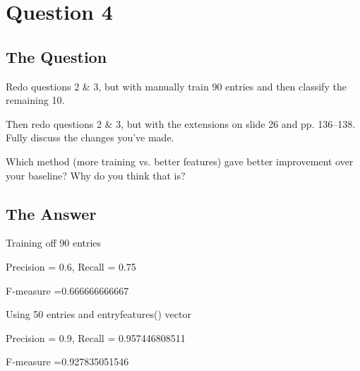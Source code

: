 \section{Question 4}

\subsection{The Question}

\begin{flushleft}

Redo questions 2 \& 3, but with manually train 90 entries and 
then classify the remaining 10.

Then redo questions 2 \& 3, but with the extensions on slide 26
and pp. 136--138.  Fully discuss the changes you've made.

Which method (more training vs. better features) gave better improvement
over your baseline?  Why do you think that is?

\end{flushleft}

\subsection{The Answer}

Training off 90 entries
\begin{center}
Precision = 0.6, Recall =  0.75

F-measure =0.666666666667
\end{center}


Using 50 entries and entryfeatures() vector
\begin{center}
Precision = 0.9, Recall =  0.957446808511

F-measure =0.927835051546
\end{center}


